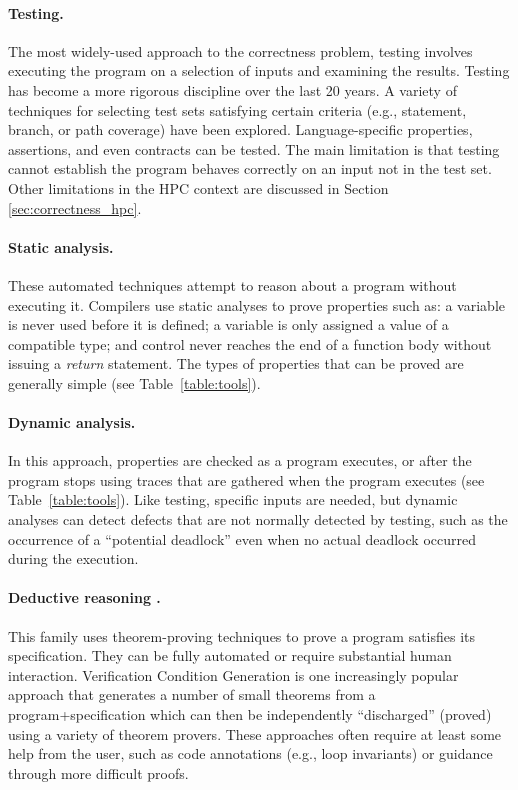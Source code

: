 \paragraph{Testing.} The most widely-used approach to the correctness problem, testing involves executing the program on a selection of inputs and examining the results.  Testing has become a more rigorous discipline over the last 20 years.  A variety of techniques for selecting test sets satisfying certain criteria (e.g., statement, branch, or path coverage) have been explored. Language-specific properties, assertions, and even contracts can be tested.  The main limitation is that testing cannot establish the program behaves correctly on an input not in the test set.  Other limitations in the HPC context are discussed in Section \ref{sec:correctness_hpc}.

\paragraph{Static analysis.}  These automated techniques attempt to reason about a program without executing it.  Compilers use static analyses to prove properties such as: a variable is never used before it is defined; a variable is only assigned a value of a compatible type; and control never reaches the end of a function body without issuing a \emph{return} statement.  The types of properties that can be proved are generally simple (see Table~\ref{table:tools}).

\paragraph{Dynamic analysis.} In this approach, properties are checked as a program executes, or after the program stops using traces that are gathered when the program executes (see Table~\ref{table:tools}).  Like testing, specific inputs are needed, but dynamic analyses can detect defects that are not normally detected by testing, such as the occurrence of a ``potential deadlock'' even when no actual deadlock occurred during the execution.

\paragraph{Deductive reasoning \cite{hoare:1969:axiomatic}.}  This family uses theorem-proving techniques to prove a program satisfies its specification.  They can be fully automated or require substantial human interaction.  Verification Condition Generation is one increasingly popular approach that generates a number of small theorems from a program+specification which can then be independently ``discharged'' (proved) using a variety of theorem provers.  These approaches often require at least some help from the user, such as code annotations (e.g., loop invariants) or guidance through more difficult proofs.

